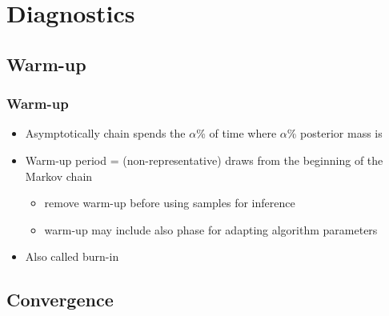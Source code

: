 \documentclass[10pt]{beamer}
\begin{document}
\section{Diagnostics}

\subsection{Warm-up}

\begin{frame}

\frametitle{Warm-up}

  \begin{itemize}
  \item Asymptotically chain spends the $\alpha$\% of time where
    $\alpha$\% posterior mass is
      \vspace{-.5\baselineskip}
    \item<3-> Warm-up period = (non-representative) draws from the beginning of the Markov chain
    \begin{itemize}
      \item remove warm-up before using samples for inference
      \item warm-up may include also phase for adapting algorithm parameters
      \end{itemize}
    \item<4-> Also called {\color{uured} burn-in}
  \end{itemize}

\end{frame}

\subsection{Convergence}
\end{document}
